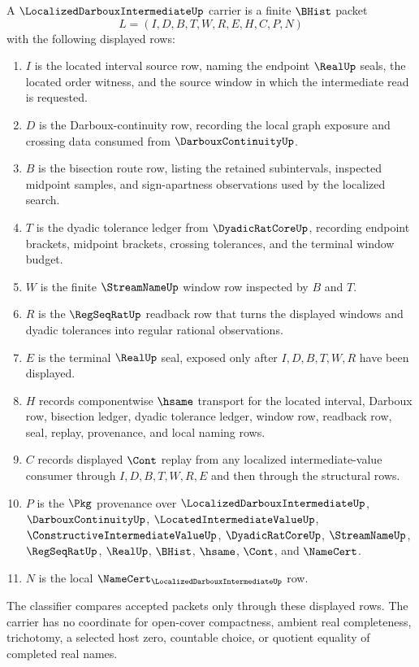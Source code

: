 \begin{definition}
\label{def:localized-darboux-intermediate-carrier}
A $\LocalizedDarbouxIntermediateUp$ carrier is a finite $\BHist$ packet
$$
L=(I,D,B,T,W,R,E,H,C,P,N)
$$
with the following displayed rows:
\begin{enumerate}
\item $I$ is the located interval source row, naming the endpoint $\RealUp$ seals, the located order witness, and the source window in which the intermediate read is requested.
\item $D$ is the Darboux-continuity row, recording the local graph exposure and crossing data consumed from $\DarbouxContinuityUp$.
\item $B$ is the bisection route row, listing the retained subintervals, inspected midpoint samples, and sign-apartness observations used by the localized search.
\item $T$ is the dyadic tolerance ledger from $\DyadicRatCoreUp$, recording endpoint brackets, midpoint brackets, crossing tolerances, and the terminal window budget.
\item $W$ is the finite $\StreamNameUp$ window row inspected by $B$ and $T$.
\item $R$ is the $\RegSeqRatUp$ readback row that turns the displayed windows and dyadic tolerances into regular rational observations.
\item $E$ is the terminal $\RealUp$ seal, exposed only after $I,D,B,T,W,R$ have been displayed.
\item $H$ records componentwise $\hsame$ transport for the located interval, Darboux row, bisection ledger, dyadic tolerance ledger, window row, readback row, seal, replay, provenance, and local naming rows.
\item $C$ records displayed $\Cont$ replay from any localized intermediate-value consumer through $I,D,B,T,W,R,E$ and then through the structural rows.
\item $P$ is the $\Pkg$ provenance over $\LocalizedDarbouxIntermediateUp$, $\DarbouxContinuityUp$, $\LocatedIntermediateValueUp$, $\ConstructiveIntermediateValueUp$, $\DyadicRatCoreUp$, $\StreamNameUp$, $\RegSeqRatUp$, $\RealUp$, $\BHist$, $\hsame$, $\Cont$, and $\NameCert$.
\item $N$ is the local $\NameCert_{\LocalizedDarbouxIntermediateUp}$ row.
\end{enumerate}
The classifier compares accepted packets only through these displayed rows. The carrier has no coordinate for open-cover compactness, ambient real completeness, trichotomy, a selected host zero, countable choice, or quotient equality of completed real names.
\end{definition}

